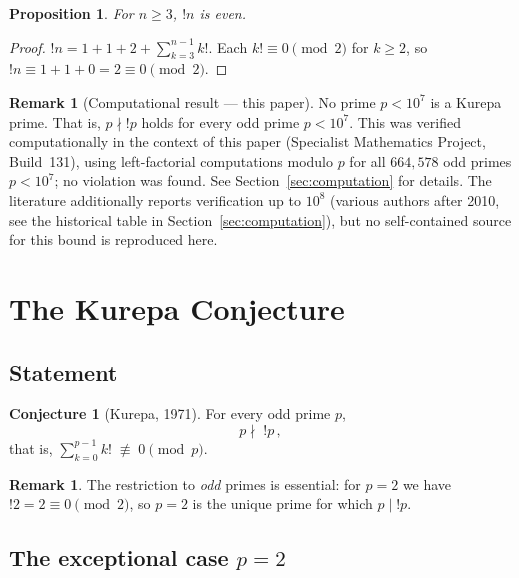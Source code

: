 \documentclass[12pt,a4paper]{amsart}
\newtheorem{proposition}[theorem]{Proposition}
\theoremstyle{definition}
\newtheorem{remark}[theorem]{Remark}
\newtheorem{conjecture}[theorem]{Conjecture}
\begin{document}
\begin{proposition}
For $n \geq 3$, $!n$ is even.
\end{proposition}
\begin{proof}
$!n = 1 + 1 + 2 + \sum_{k=3}^{n-1} k!$.
Each $k! \equiv 0 \pmod{2}$ for $k \geq 2$, so $!n \equiv 1+1+0 = 2 \equiv 0
\pmod{2}$.
\end{proof}

\begin{remark}[Computational result --- this paper]
\label{rem:comp-result}
No prime $p < 10^7$ is a Kurepa prime.
That is, $p \nmid !p$ holds for every odd prime $p < 10^7$.
This was verified computationally in the context of this paper
(Specialist Mathematics Project, Build~131), using left-factorial computations
modulo $p$ for all $664{,}578$ odd primes $p < 10^7$; no violation was found.
See Section~\ref{sec:computation} for details.
The literature additionally reports verification up to $10^8$ (various authors
after 2010, see the historical table in Section~\ref{sec:computation}),
but no self-contained source for this bound is reproduced here.
\end{remark}

\section{The Kurepa Conjecture}
\label{sec:conjecture}

\subsection{Statement}

\begin{conjecture}[Kurepa, 1971]\label{conj:kurepa}
For every odd prime $p$,
\[
  p \nmid\; !p\,,
\]
that is, $\displaystyle\sum_{k=0}^{p-1} k! \;\not\equiv\; 0 \pmod{p}$.
\end{conjecture}

\begin{remark}
The restriction to \emph{odd} primes is essential: for $p = 2$ we have
$!2 = 2 \equiv 0 \pmod{2}$, so $p = 2$ is the unique prime for which $p \mid !p$.
\end{remark}

\subsection{The exceptional case $p=2$}
\end{document}
